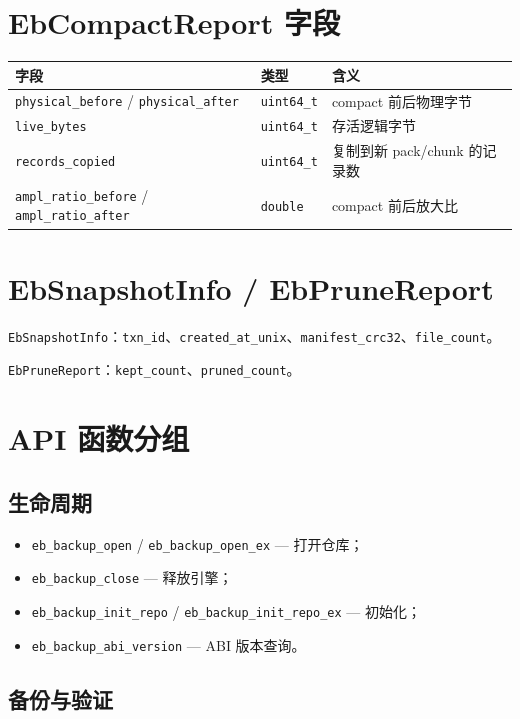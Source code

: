 \section{EbCompactReport 字段}

\begin{longtable}{@{}llp{8cm}@{}}
\toprule
字段 & 类型 & 含义 \\
\midrule
\texttt{physical\_before} / \texttt{physical\_after} & \texttt{uint64\_t} & compact 前后物理字节 \\
\texttt{live\_bytes} & \texttt{uint64\_t} & 存活逻辑字节 \\
\texttt{records\_copied} & \texttt{uint64\_t} & 复制到新 pack/chunk 的记录数 \\
\texttt{ampl\_ratio\_before} / \texttt{ampl\_ratio\_after} & \texttt{double} & compact 前后放大比 \\
\bottomrule
\end{longtable}

\section{EbSnapshotInfo / EbPruneReport}

\texttt{EbSnapshotInfo}：\texttt{txn\_id}、\texttt{created\_at\_unix}、\texttt{manifest\_crc32}、\texttt{file\_count}。

\texttt{EbPruneReport}：\texttt{kept\_count}、\texttt{pruned\_count}。

\section{API 函数分组}

\subsection{生命周期}

\begin{itemize}[nosep]
  \item \texttt{eb\_backup\_open} / \texttt{eb\_backup\_open\_ex} — 打开仓库；
  \item \texttt{eb\_backup\_close} — 释放引擎；
  \item \texttt{eb\_backup\_init\_repo} / \texttt{eb\_backup\_init\_repo\_ex} — 初始化；
  \item \texttt{eb\_backup\_abi\_version} — ABI 版本查询。
\end{itemize}

\subsection{备份与验证}

